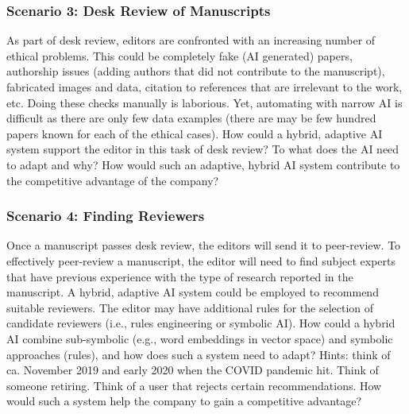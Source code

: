 \subsubsection{Scenario 3: Desk Review of Manuscripts}

As part of desk review, editors are confronted with an increasing number of ethical problems. This could be
completely fake (AI generated) papers, authorship issues (adding authors that did not contribute to the manuscript),
fabricated images and data, citation to references that are irrelevant to the work, etc. Doing these checks manually
is laborious. Yet, automating with narrow AI is difficult as there are only few data examples (there are may be few
hundred papers known for each of the ethical cases). How could a hybrid, adaptive AI system support the editor in
this task of desk review? To what does the AI need to adapt and why? How would such an adaptive, hybrid AI system
contribute to the competitive advantage of the company?


\subsubsection{Scenario 4: Finding Reviewers}

Once a manuscript passes desk review, the editors will send it to peer-review. To effectively peer-review a
manuscript, the editor will need to find subject experts that have previous experience with the type of research
reported in the manuscript. A hybrid, adaptive AI system could be employed to recommend suitable reviewers. The
editor may have additional rules for the selection of candidate reviewers (i.e., rules engineering or symbolic AI).
How could a hybrid AI combine sub-symbolic (e.g., word embeddings in vector space) and symbolic approaches (rules),
and how does such a system need to adapt? Hints: think of ca. November 2019 and early 2020 when the COVID pandemic
hit. Think of someone retiring. Think of a user that rejects certain recommendations. How would such a system help
the company to gain a competitive advantage?
